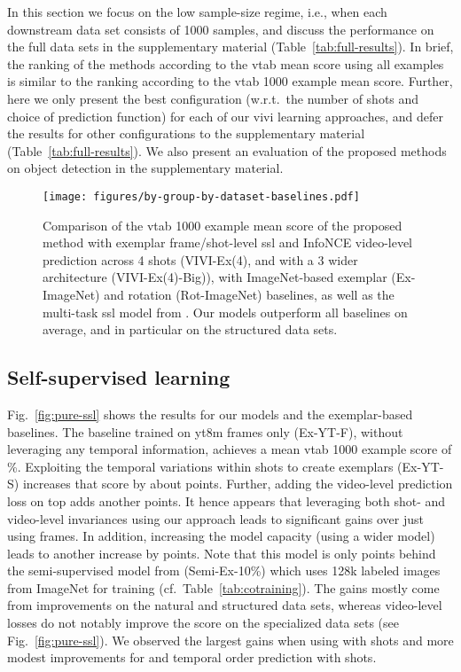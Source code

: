 \documentclass[10pt,twocolumn,letterpaper]{article}
\renewcommand{\paragraph}[1]{\noindent{\bf #1}\quad}
\begin{document}
{In this section we focus on the low sample-size regime, i.e., when each downstream data set consists of 1000 samples, and discuss the performance on the full data sets in the supplementary material (Table~\ref{tab:full-results}). In brief, the ranking of the methods according to the \gls{vtab} mean score using all examples is similar to the ranking according to the \gls{vtab} 1000 example mean score. Further, here we only present the best configuration (w.r.t.\ the number of shots  and choice of prediction function) for each of our \gls{vivi} learning approaches, and defer the results for other configurations to the supplementary material (Table~\ref{tab:full-results}). We also present an evaluation of the proposed methods on object detection in the supplementary material.

\begin{figure*}[t!]
\vspace{-0.2cm}
\centering
\texttt{[image: figures/by-group-by-dataset-baselines.pdf]}
\vspace{-0.2cm}
\caption{Comparison of the \gls{vtab} 1000 example mean score of the proposed method with exemplar frame/shot-level \gls{ssl} and InfoNCE video-level prediction across 4 shots (VIVI-Ex(4), and with a 3 wider architecture (VIVI-Ex(4)-Big)), with ImageNet-based exemplar (Ex-ImageNet) and rotation (Rot-ImageNet) baselines, as well as the multi-task \gls{ssl} model from \cite{doersch2017multi}. Our models outperform all baselines on average, and in particular on the structured data sets.}
\label{fig:baselines}
\end{figure*}

\subsection{Self-supervised learning}

\paragraph{Exemplar}
Fig.~\ref{fig:pure-ssl} shows the results for our models and the exemplar-based baselines. The baseline trained on \gls{yt8m} frames only (Ex-YT-F), without leveraging any temporal information, achieves a mean \gls{vtab} 1000 example score of \%.
Exploiting the temporal variations within shots to create exemplars (Ex-YT-S) increases that score by about  points. Further, adding the video-level prediction loss on top adds another  points. It hence appears that leveraging both shot- and video-level invariances using our approach leads to significant gains over just using frames. In addition, increasing the model capacity (using a wider model) leads to another increase by  points. Note that this model is only  points behind the semi-supervised model from \cite{zhai2019s4l} (Semi-Ex-10\%) which uses 128k labeled images from ImageNet for training (cf.\ Table~\ref{tab:cotraining}). The gains mostly come from improvements on the natural and structured data sets, whereas video-level losses do not notably improve the score on the specialized data sets (see Fig.\ \ref{fig:pure-ssl}). We observed the largest gains when using  with  shots and more modest improvements for  and temporal order prediction with  shots.

}
\end{document}
